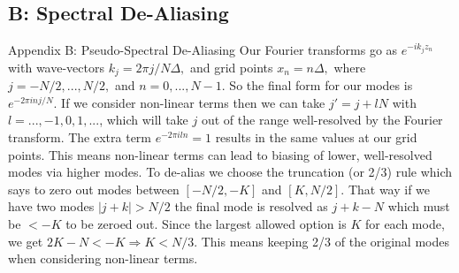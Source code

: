 \documentclass[aspectratio=43]{beamer}
\begin{document}
   \subsection{B: Spectral De-Aliasing}

   \begin{frame}{Appendix B: Pseudo-Spectral De-Aliasing}
      \vspace*{-3mm}
         \quad Our Fourier transforms go as $e^{-ik_jz_n}$ with wave-vectors $k_j = 2\pi j/N\Delta,$ and grid points
      $x_n = n\Delta,$ where $j=-N/2,...,N/2,$ and $n = 0,...,N-1.$ So the final form for our modes is $e^{-2\pi inj/N}.$
      If we consider non-linear terms then we can take $j'=j+lN$ with $l=...,-1,0,1,...$, which will take $j$ out of the range well-resolved
      by the Fourier transform. The extra term $e^{-2\pi iln} = 1$ results in the same values at our grid points. This means non-linear
      terms can lead to biasing of lower, well-resolved modes via higher modes. To de-alias we choose the truncation (or 2/3) rule which
      says to zero out modes between $[-N/2,-K]$ and $[K,N/2]$. That way if we have two modes $\vert j+k\vert >N/2$ the final mode is resolved
      as $j+k-N$ which must be $<-K$ to be zeroed out. Since the largest allowed option is $K$ for each mode, we get $2K-N < -K \Rightarrow K<N/3$.
      This means keeping 2/3 of the original modes when considering non-linear terms.
   \end{frame}
\end{document}
